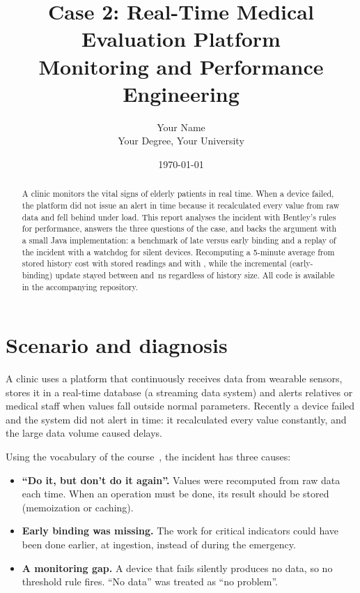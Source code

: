 \documentclass[11pt,a4paper]{article}
\title{\textbf{Case 2: Real-Time Medical Evaluation Platform}\\[2pt]
\large Monitoring and Performance Engineering}
\author{Your Name \\ Your Degree, Your University}
\date{\today}
\begin{document}
\maketitle

\begin{abstract}
A clinic monitors the vital signs of elderly patients in real time. When a device failed, the platform did not issue an alert in time because it recalculated every value from raw data and fell behind under load. This report analyses the incident with Bentley's rules for performance, answers the three questions of the case, and backs the argument with a small Java implementation: a benchmark of late versus early binding and a replay of the incident with a watchdog for silent devices. Recomputing a 5-minute average from stored history cost \lateSmall{} with \nSmall{} stored readings and \lateLarge{} with \nLarge{}, while the incremental (early-binding) update stayed between \earlyLow{} and \earlyHigh{}\,ns regardless of history size. All code is available in the accompanying repository.
\end{abstract}

\section{Scenario and diagnosis}

A clinic uses a platform that continuously receives data from wearable sensors, stores it in a real-time database (a streaming data system) and alerts relatives or medical staff when values fall outside normal parameters. Recently a device failed and the system did not alert in time: it recalculated every value constantly, and the large data volume caused delays.

Using the vocabulary of the course~\cite{lecture,applications}, the incident has three causes:

\begin{itemize}
  \item \textbf{``Do it, but don't do it again''.} Values were recomputed from raw data each time. When an operation must be done, its result should be stored (memoization or caching).
  \item \textbf{Early binding was missing.} The work for critical indicators could have been done earlier, at ingestion, instead of during the emergency.
  \item \textbf{A monitoring gap.} A device that fails silently produces no data, so no threshold rule fires. ``No data'' was treated as ``no problem''.
\end{itemize}
\end{document}
